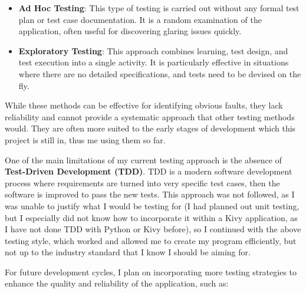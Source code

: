 \documentclass{article}
\begin{document}
\begin{itemize}
    \item \textbf{Ad Hoc Testing}: This type of testing is carried out without any formal test plan or test case documentation. It is a random examination of the application, often useful for discovering glaring issues quickly.
    \item \textbf{Exploratory Testing}: This approach combines learning, test design, and test execution into a single activity. It is particularly effective in situations where there are no detailed specifications, and tests need to be devised on the fly.
\end{itemize}

While these methods can be effective for identifying obvious faults, they lack reliability and cannot provide a systematic approach that other testing methods would. They are often more suited to the early stages of development which this project is still in, thus me using them so far.\\\vspace{0.3cm}


One of the main limitations of my current testing approach is the absence of \textbf{Test-Driven Development (TDD)}. TDD is a modern software development process where requirements are turned into very specific test cases, then the software is improved to pass the new tests. This approach was not followed, as I was unable to justify what I would be testing for (I had planned out unit testing, but I especially did not know how to incorporate it within a Kivy application, as I have not done TDD with Python or Kivy before), so I continued with the above testing style, which worked and allowed me to create my program efficiently, but not up to the industry standard that I know I should be aiming for.\\\vspace{0.3cm}

\newpage
For future development cycles, I plan on incorporating more testing strategies to enhance the quality and reliability of the application, such as:
\end{document}
